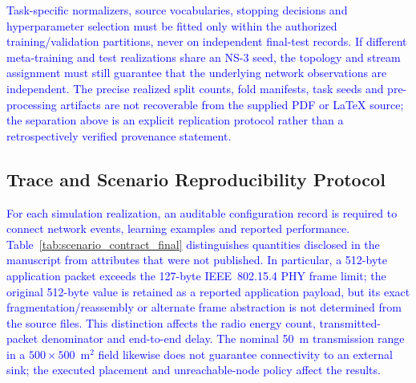 \documentclass[pdflatex,sn-mathphys-num]{sn-jnl}
\newcommand{\Revised}[1]{\textcolor{blue}{#1}}
\begin{document}
\Revised{Task-specific normalizers, source vocabularies, stopping decisions and hyperparameter selection must be fitted only within the authorized training/validation partitions, never on independent final-test records. If different meta-training and test realizations share an NS-3 seed, the topology and stream assignment must still guarantee that the underlying network observations are independent. The precise realized split counts, fold manifests, task seeds and pre-processing artifacts are not recoverable from the supplied PDF or LaTeX source; the separation above is an explicit replication protocol rather than a retrospectively verified provenance statement.}

\subsection{Trace and Scenario Reproducibility Protocol}
\label{sec:trace_protocol_final}
\Revised{For each simulation realization, an auditable configuration record is required to connect network events, learning examples and reported performance. Table~\ref{tab:scenario_contract_final} distinguishes quantities disclosed in the manuscript from attributes that were not published. In particular, a 512-byte application packet exceeds the 127-byte IEEE~802.15.4 PHY frame limit; the original 512-byte value is retained as a reported application payload, but its exact fragmentation/reassembly or alternate frame abstraction is not determined from the source files. This distinction affects the radio energy count, transmitted-packet denominator and end-to-end delay. The nominal 50~m transmission range in a $500\times500$~m$^2$ field likewise does not guarantee connectivity to an external sink; the executed placement and unreachable-node policy affect the results.}
\end{document}
